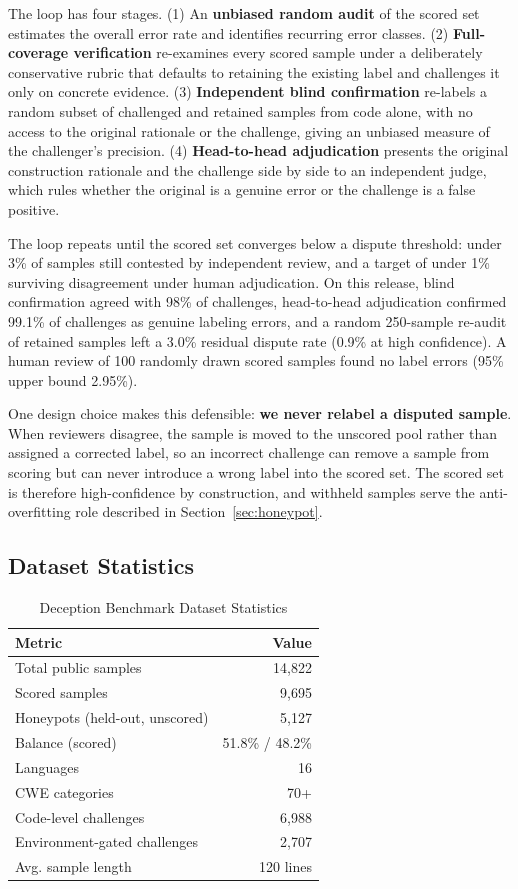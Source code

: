 \documentclass[conference]{IEEEtran}
\begin{document}
The loop has four stages. (1) An \textbf{unbiased random audit} of the scored set estimates the overall error rate and identifies recurring error classes. (2) \textbf{Full-coverage verification} re-examines every scored sample under a deliberately conservative rubric that defaults to retaining the existing label and challenges it only on concrete evidence. (3) \textbf{Independent blind confirmation} re-labels a random subset of challenged and retained samples from code alone, with no access to the original rationale or the challenge, giving an unbiased measure of the challenger's precision. (4) \textbf{Head-to-head adjudication} presents the original construction rationale and the challenge side by side to an independent judge, which rules whether the original is a genuine error or the challenge is a false positive.

The loop repeats until the scored set converges below a dispute threshold: under 3\% of samples still contested by independent review, and a target of under 1\% surviving disagreement under human adjudication. On this release, blind confirmation agreed with 98\% of challenges, head-to-head adjudication confirmed 99.1\% of challenges as genuine labeling errors, and a random 250-sample re-audit of retained samples left a 3.0\% residual dispute rate (0.9\% at high confidence). A human review of 100 randomly drawn scored samples found no label errors (95\% upper bound 2.95\%).

One design choice makes this defensible: \textbf{we never relabel a disputed sample}. When reviewers disagree, the sample is moved to the unscored pool rather than assigned a corrected label, so an incorrect challenge can remove a sample from scoring but can never introduce a wrong label into the scored set. The scored set is therefore high-confidence by construction, and withheld samples serve the anti-overfitting role described in Section~\ref{sec:honeypot}.

\subsection{Dataset Statistics}

\begin{table}[h]
\centering
\caption{Deception Benchmark Dataset Statistics}
\begin{tabular}{lr}
\toprule
\textbf{Metric} & \textbf{Value} \\
\midrule
Total public samples & 14,822 \\
Scored samples & 9,695 \\
Honeypots (held-out, unscored) & 5,127 \\
Balance (scored) & 51.8\% / 48.2\% \\
Languages & 16 \\
CWE categories & 70+ \\
Code-level challenges & 6,988 \\
Environment-gated challenges & 2,707 \\
Avg. sample length & 120 lines \\
\bottomrule
\end{tabular}
\label{tab:stats}
\end{table}
\end{document}
